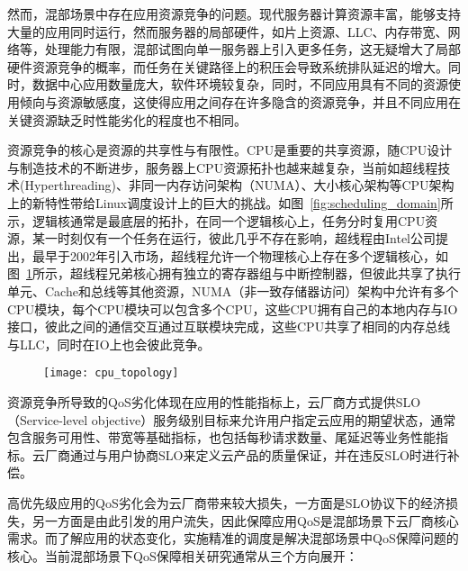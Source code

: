 然而，混部场景中存在应用资源竞争的问题。现代服务器计算资源丰富，能够支持大量的应用同时运行，然而服务器的局部硬件，如片上资源、LLC、内存带宽、网络等，处理能力有限，混部试图向单一服务器上引入更多任务，这无疑增大了局部硬件资源竞争的概率，而任务在关键路径上的积压会导致系统排队延迟的增大。同时，数据中心应用数量庞大，软件环境较复杂，同时，不同应用具有不同的资源使用倾向与资源敏感度，这使得应用之间存在许多隐含的资源竞争，并且不同应用在关键资源缺乏时性能劣化的程度也不相同。

资源竞争的核心是资源的共享性与有限性。CPU是重要的共享资源，随CPU设计与制造技术的不断进步，服务器上CPU资源拓扑也越来越复杂，当前如超线程技术(Hyperthreading)、非同一内存访问架构（NUMA）、大小核心架构等CPU架构上的新特性带给Linux调度设计上的巨大的挑战。如图~\ref{fig:scheduling_domain}所示，逻辑核通常是最底层的拓扑，在同一个逻辑核心上，任务分时复用CPU资源，某一时刻仅有一个任务在运行，彼此几乎不存在影响，超线程由Intel公司提出，最早于2002年引入市场，超线程允许一个物理核心上存在多个逻辑核心，如图~\ref{fig:cpu_topology}所示，超线程兄弟核心拥有独立的寄存器组与中断控制器，但彼此共享了执行单元、Cache和总线等其他资源，NUMA（非一致存储器访问）架构中允许有多个CPU模块，每个CPU模块可以包含多个CPU，这些CPU拥有自己的本地内存与IO接口，彼此之间的通信交互通过互联模块完成，这些CPU共享了相同的内存总线与LLC，同时在IO上也会彼此竞争。

\begin{figure}[!htbp]
    \centering
    \texttt{[image: cpu\_topology]}
    \label{fig:cpu_topology}
\end{figure}

资源竞争所导致的QoS劣化体现在应用的性能指标上，云厂商方式提供SLO（Service-level objective）服务级别目标来允许用户指定云应用的期望状态，通常包含服务可用性、带宽等基础指标，也包括每秒请求数量、尾延迟等业务性能指标。云厂商通过与用户协商SLO来定义云产品的质量保证，并在违反SLO时进行补偿。

高优先级应用的QoS劣化会为云厂商带来较大损失，一方面是SLO协议下的经济损失，另一方面是由此引发的用户流失，因此保障应用QoS是混部场景下云厂商核心需求。而了解应用的状态变化，实施精准的调度是解决混部场景中QoS保障问题的核心。当前混部场景下QoS保障相关研究通常从三个方向展开：

